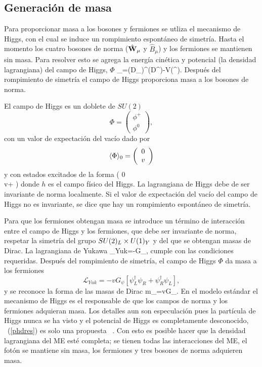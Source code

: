 \subsection{Generaci\'on de masa}
Para proporcionar masa a los bosones y fermiones se utliza el mecanismo de
Higgs, con el cual se induce un rompimiento espont\'aneo de simetr\'ia.  
Hasta el momento los cuatro bosones de norma ($\hat{\bf  W}_{\mu}$ y $\hat 
B_{\mu}$) y los fermiones se mantienen sin masa. Para resolver esto se agrega
la energ\'ia cin\'etica y potencial (la densidad lagrangiana) del campo de 
Higgs, $\Phi$
\be\label{lhiggs}
_{\Phi}=(D_{\mu}\Phi)^{\dag}(D^{\mu}\Phi)-V(\Phi^{\dag}\Phi).
\ee
Despu\'es del rompimiento de simetr\'ia el campo de Higgs
proporciona masa a los bosones de norma. 

El campo de Higgs es un doblete de $SU(2)$
$$
\Phi=\left(\begin{array}{c}\phi^+\\ \phi^0\end{array}\right),
$$
con un valor de expectaci\'on del vac\'io dado por
$$
\langle\Phi\rangle_0=\left(\ba{c} 0\\ v
\ea\right)
$$
y con estados excitados de la forma
\be\label{vevhe}
\left( 0\\ v+  \ea\right)
\ee
donde $h$ es el campo f\'isico del Higgs. La lagrangiana de Higgs debe de ser
invariante de norma localmente. Si el valor de expectaci\'on del vac\'io del
campo de Higgs no es invariante, se dice que hay un rompimiento espont\'aneo de 
simetr\'ia. 

Para que los fermiones obtengan masa se introduce un t\'ermino de interacci\'on
entre el campo de Higgs y los fermiones, que debe ser invariante de norma, 
respetar la simetr\'ia del grupo $\gme$ y del que se obtengan masas de Dirac. La
lagrangiana de Yukawa
\be\label{ly}
_{Yuk}=-G_{\psi},
\ee
cumple con las condiciones requeridas. Despu\'es del rompimiento de simetr\'ia, 
el campo de Higgs $\Phi$ da masa a los fermiones
$$
\mathcal{L}_{Yuk}=-vG_{\psi}\left[\psi^{\dag}_L\psi_R+
\psi^{\dag}_R\psi_L\right],
$$
y se reconoce la forma de las masas de Dirac
\be\label{jojojo}
m_{\psi}=vG_{\psi}.
\ee
En el modelo est\'andar el mecanismo de Higgs es el responsable de que los 
campos de norma y los fermiones adquieran masa. Los detalles aun son 
especulaci\'on pues la part\'icula de Higgs nunca se ha visto y el potencial de 
Higgs es completamente desconocido, ~(\ref{phdres}) es solo una propuesta 
~\cite{Gri198701}.
Con esto es posible hacer que la densidad lagrangiana del ME est\'e completa; 
se tienen todas las interacciones del ME, el fot\'on se mantiene sin masa, los
fermiones y tres bosones de norma adquieren masa.

